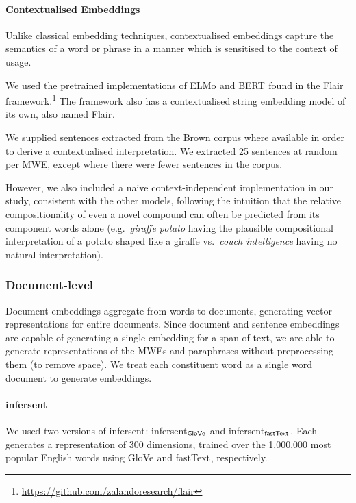\documentclass[11pt,a4paper]{article}
\newcommand{\embmethod}[2][]{\textsf{#2}$_{\text{#1}}$\xspace}
\newcommand{\infersent}[1][]{\embmethod[#1]{infersent}}
\newcommand{\elmo}{\embmethod{ELMo}}
\newcommand{\fasttext}{\embmethod{fastText}}
\newcommand{\glove}{\embmethod{GloVe}}
\newcommand{\bert}{\embmethod{BERT}}
\newcommand{\flair}{\embmethod{Flair}}
\begin{document}
\paragraph{Contextualised Embeddings}
Unlike classical embedding techniques, contextualised embeddings capture the semantics of a word or phrase in a manner which is sensitised to the context of usage.

We used the pretrained implementations of \elmo \cite{Peters2018} and \bert \cite{Devlin2018} found in the \flair framework.\footnote{\url{https://github.com/zalandoresearch/flair}} The framework also has a contextualised string embedding model of its own, also named \flair \cite{Akbik2018}.

We supplied sentences extracted from the Brown corpus where available in order to derive a contextualised interpretation. We extracted 25 sentences at random per MWE, except where there were fewer sentences in the corpus.

However, we also included a naive context-independent implementation in our study, consistent with the other models, following the intuition that the relative compositionality of even a novel compound can often be predicted from its component words alone (e.g.\ \textit{giraffe potato} having the plausible compositional interpretation of a potato shaped like a giraffe vs.\ \textit{couch intelligence} having no natural interpretation).

\subsubsection{Document-level}
Document embeddings aggregate from words to documents, generating vector representations for entire documents. Since document and sentence embeddings are capable of generating a single embedding for a span of text, we are able to generate representations of the MWEs and paraphrases without preprocessing them (to remove space). We treat each constituent word as a single word document to generate embeddings.

\paragraph{\infersent}
We used two versions of \infersent \cite{Conneau2017b}: \infersent[\glove] and \infersent[\fasttext]. Each generates a representation of 300 dimensions, trained over the 1,000,000 most popular English words using \glove \cite{Jeffrey2014} and \fasttext, respectively.
\end{document}
